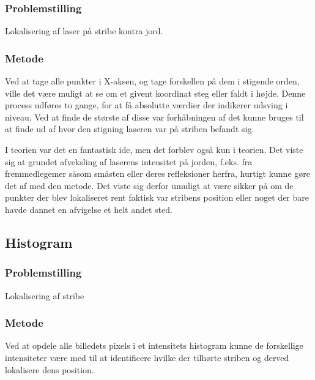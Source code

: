\subsubsection{Problemstilling}
Lokalisering af laser på stribe kontra jord.

\subsubsection{Metode}
Ved at tage alle punkter i X-aksen, og tage forskellen på dem i stigende orden, ville det være muligt at se om et givent koordinat steg eller faldt i højde.
Denne process udføres to gange, for at få absolutte værdier der indikerer udsving i niveau. Ved at finde de største af disse var forhåbningen af det kunne bruges til at finde ud af hvor den stigning laseren var på striben befandt sig.

I teorien var det en fantastisk ide, men det forblev også kun i teorien. Det viste sig at grundet afveksling af laserens intensitet på jorden, f.eks. fra fremmedlegemer såsom småsten eller deres refleksioner herfra, hurtigt kunne gøre det af med den metode.
Det viste sig derfor umuligt at være sikker på om de punkter der blev lokaliseret rent faktisk var stribens position eller noget der bare havde dannet en afvigelse et helt andet sted.

\subsection{Histogram}

\subsubsection{Problemstilling}
Lokalisering af stribe

\subsubsection{Metode}
Ved at opdele alle billedets pixels i et intensitets histogram kunne de forskellige intensiteter være med til at identificere hvilke der tilhørte striben og derved lokalisere dens position.
\\
